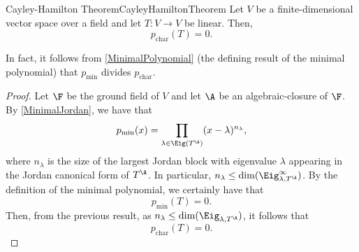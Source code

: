 \begin{crl}{Cayley-Hamilton Theorem}{CayleyHamiltonTheorem}
	Let $V$ be a finite-dimensional vector space over a field and let $T\colon V\rightarrow V$ be linear.  Then,
	\begin{equation}
		p_{\operatorname{char}}(T)=0.
	\end{equation}
	\begin{rmk}
		In fact, it follows from \cref{MinimalPolynomial} (the defining result of the minimal polynomial) that $p_{\min}$ divides $p_{\operatorname{char}}$.
	\end{rmk}
	\begin{proof}
		Let $\F$ be the ground field of $V$ and let $\A$ be an algebraic-closure of $\F$.  By \cref{MinimalJordan}, we have that
		\begin{equation}
			p_{\min}(x)=\prod _{\lambda \in \Eig (T^{\A})}(x-\lambda )^{n_{\lambda}},
		\end{equation}
		where $n_{\lambda}$ is the size of the largest Jordan block with eigenvalue $\lambda$ appearing in the Jordan canonical form of $T^{\A}$.  In particular, $n_{\lambda}\leq \dim (\Eig _{\lambda, T^{\A}}^{\infty})$.  By the definition of the minimal polynomial, we certainly have that
		\begin{equation}
			p_{\min}(T)=0.
		\end{equation}
		Then, from the previous result, as $n_{\lambda}\leq \dim (\Eig _{\lambda ,T^{\A}})$, it follows that
		\begin{equation}
			p_{\operatorname{char}}(T)=0.
		\end{equation}
	\end{proof}
\end{crl}

